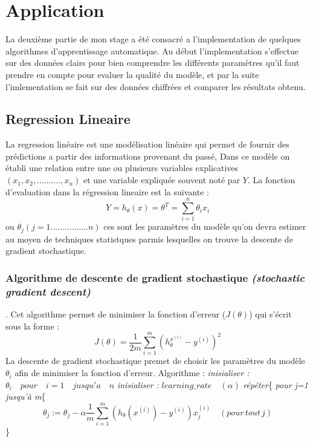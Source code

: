 \documentclass[a4paper,12pt]{article}
\begin{document}
\newpage
\newpage
\section{Application}
La deuxième partie de mon stage a été consacré a l'implementation de quelques algorithmes d'apprentissage automatique.\newline
Au début l'implementation s'effectue sur des données clairs pour bien comprendre les différents paramètres qu'il faut prendre en compte pour evaluer la qualité du modèle, et par la suite l'imlementation se fait sur des données chiffrées et comparer les résultats obtenu. \newline      
\subsection {Regression Lineaire}
La regression linéaire est une modélisation linéaire qui permet de fournir des prédictions a partir des informations provenant du passé, 
Dans ce modèle on établi une relation entre une ou plusieurs variables explicatives $(x_1,x_2,..........,x_n)$ et une variable expliquée souvent noté par $Y$.\newline
La fonction d'evaluation dans la régression lineaire est la suivante : \newline
$$Y =h_{\theta}(x) = \theta^T = \sum_{i=1}^{n} \theta_ix_i $$\newline
ou $\theta_j (j=1................n)$ ces sont les paramètres du modèle qu'on devra estimer au moyen de techniques statistques parmis  lesquelles on trouve la descente de gradient stochastique.\newline
\subsubsection{Algorithme de descente de gradient stochastique \textit{(stochastic gradient descent)}}.\newline
Cet algorithme permet de minimiser la fonction d'erreur ($J(\theta)$) qui s'écrit sous la forme : \newline
$$J(\theta) = \dfrac{1}{2m}\sum_{i=1}^{m} (h_{\theta}^{x^{(i)}} - y^{(i)})^2$$\newline  
\newline
La descente de gradient stochastique premet de choisir les paramètres du modèle $\theta_i$ afin de minimiser la fonction d'erreur.\newline
Algorithme : \newline
\textit{inisialiser :} $\theta_i\quad pour\quad i=1 \quad jusqu'a\quad n$\newline
\textit{inisialiser : }$learning\_rate\quad(\alpha)$\newline
\textit{répéter}\{\newline 
\hspace*{1cm}\textit{pour j=1 jusqu'à m}\{
$$\theta_j := \theta_j - \alpha  \dfrac{1}{m}\sum_{i = 1}^{m} (h_\theta(x^{(i)}) - y^{(i)})x_j^{(i)} \quad(pour\, tout \, j)$$
\hspace*{1cm}\}\newline
\end{document}
